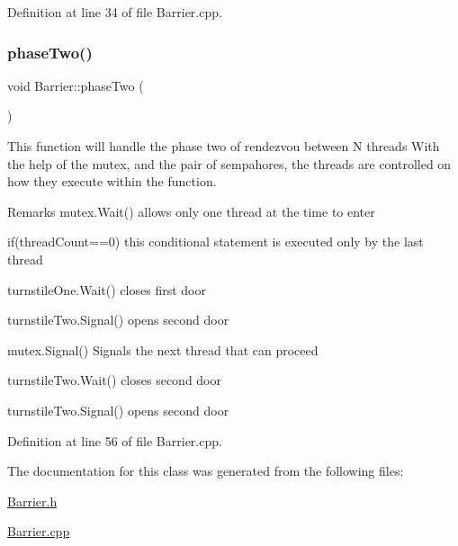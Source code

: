Definition at line 34 of file Barrier.\+cpp.

\mbox{\label{class_barrier_a63271a70390e6680b07d7e701ff6b2e3}} 
\subsubsection{\texorpdfstring{phase\+Two()}{phaseTwo()}}
{\footnotesize\ttfamily void Barrier\+::phase\+Two (\begin{DoxyParamCaption}{ }\end{DoxyParamCaption})}



This function will handle the phase two of rendezvou between N threads With the help of the mutex, and the pair of sempahores, the threads are controlled on how they execute within the function. 

\begin{DoxyRemark}{Remarks}
mutex.\+Wait() allows only one thread at the time to enter

if(thread\+Count==0) this conditional statement is executed only by the last thread

turnstile\+One.\+Wait() closes first door

turnstile\+Two.\+Signal() opens second door

mutex.\+Signal() Signals the next thread that can proceed

turnstile\+Two.\+Wait() closes second door

turnstile\+Two.\+Signal() opens second door 
\end{DoxyRemark}


Definition at line 56 of file Barrier.\+cpp.



The documentation for this class was generated from the following files\+:\begin{DoxyCompactItemize}
\item 
\hyperlink{_barrier_8h}{Barrier.\+h}\item 
\hyperlink{_barrier_8cpp}{Barrier.\+cpp}\end{DoxyCompactItemize}
